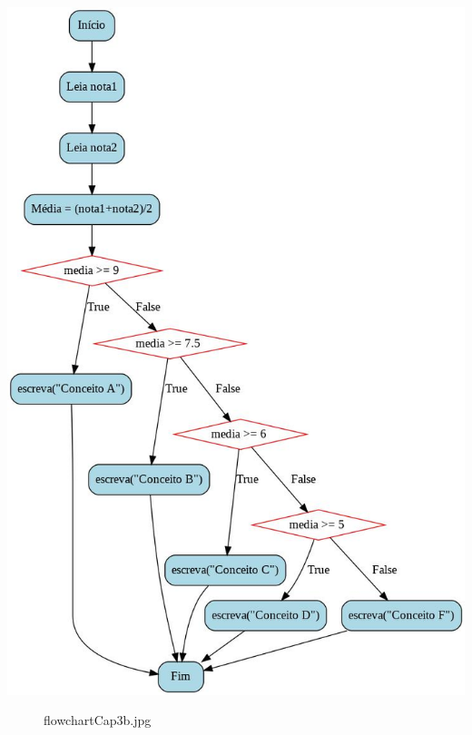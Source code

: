 \documentclass[12pt,a4paper]{article}
\begin{document}
\includegraphics{"figs/flowchartCap3b.jpg"}

    \begin{figure}
\centering
\caption{flowchartCap3b.jpg}
\end{figure}
\end{document}
